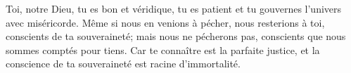 Toi, notre Dieu, tu es bon et véridique,
	tu es patient et tu gouvernes l’univers avec miséricorde.
Même si nous en venions à pécher, nous resterions à toi, conscients de ta souveraineté;
	mais nous ne pécherons pas, conscients que nous sommes comptés pour tiens.
Car te connaître est la parfaite justice,
	et la conscience de ta souveraineté est racine d’immortalité.
